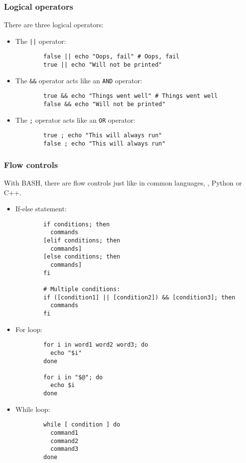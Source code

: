 \subsubsection{Logical operators}
There are three logical operators:
\begin{itemize}
	\setlength\itemsep{0em}
	\item The \texttt{||} operator:
	\begin{verbatim}
		false || echo "Oops, fail" # Oops, fail
		true || echo "Will not be printed"
	\end{verbatim}
	\item The \verb|&&| operator acts like an \texttt{AND} operator:
	\begin{verbatim}
		true && echo "Things went well" # Things went well
		false && echo "Will not be printed"		
	\end{verbatim}
	\item The \texttt{;} operator acts like an \texttt{OR} operator:
	\begin{verbatim}
		true ; echo "This will always run"
		false ; echo "This will always run"
	\end{verbatim}
\end{itemize}

\subsubsection{Flow controls}
With \ac{BASH}, there are flow controls just like in common languages, \eg, Python or C++.
\begin{itemize}
	\setlength\itemsep{0em}
	\item If-else statement:
	\begin{verbatim}
		if conditions; then
		  commands
		[elif conditions; then
		  commands]
		[else conditions; then
		  commands]
		fi
		
		# Multiple conditions:
		if ([condition1] || [condition2]) && [condition3]; then
		  commands
		fi
	\end{verbatim}
		
	\item For loop:
	\begin{verbatim}
		for i in word1 word2 word3; do
		  echo "$i"
		done
		
		for i in "$@"; do
		  echo $i
		done
	\end{verbatim}
	\item While loop:
	\begin{verbatim}
		while [ condition ] do
		  command1
		  command2
		  command3
		done
	\end{verbatim}
	
\end{itemize}

